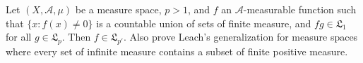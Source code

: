 Let $(X, \mathcal{A}, \mu)$ be a measure space, $p > 1$, and $f$ an $\mathcal{A}$-measurable function such that $\{x : f(x) \neq 0\}$ is a countable union of sets of finite measure, and $fg \in \mathfrak{L}_1$ for all $g \in \mathfrak{L}_p$. Then $f \in \mathfrak{L}_{p'}$. Also prove Leach's generalization for measure spaces where every set of infinite measure contains a subset of finite positive measure.
